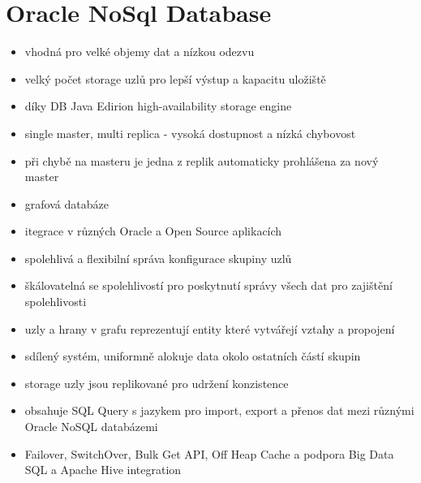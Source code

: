 \documentclass[czech,bachelor,dept460,male,csharp,cpdeclaration]{diploma}
\begin{document}
	\section{Oracle NoSql Database}
		\begin{itemize}
			\item vhodná pro velké objemy dat a nízkou odezvu
			\item velký počet storage uzlů pro lepší výstup a kapacitu uložiště
			\item díky DB Java Edirion high-availability storage engine
			\item single master, multi replica - vysoká dostupnost a nízká chybovost
			\item při chybě na masteru je jedna z replik automaticky prohlášena za nový master
			\item grafová databáze
			\item itegrace v různých Oracle a Open Source aplikacích
			\item spolehlivá a flexibilní správa konfigurace skupiny uzlů
			\item škálovatelná se spolehlivostí pro poskytnutí správy všech dat pro zajištění spolehlivosti
			\item uzly a hrany v grafu reprezentují entity které vytvářejí vztahy a propojení
			\item sdílený systém, uniformně alokuje data okolo ostatních částí skupin
			\item storage uzly jsou replikované pro udržení konzistence
			\item obsahuje SQL Query s jazykem pro import, export a přenos dat mezi různými Oracle NoSQL databázemi
			\item Failover, SwitchOver, Bulk Get API, Off Heap Cache a podpora Big Data SQL a Apache Hive integration
		\end{itemize}

	
\end{document}

